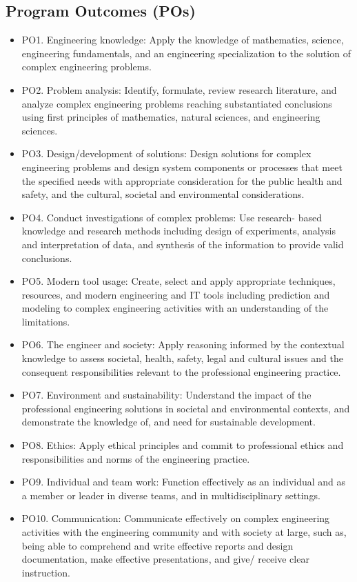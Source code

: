 \documentclass[12pt]{report}	%
\begin{document}
\subsection*{Program Outcomes (POs)}
\begin{itemize}
    \item PO1. Engineering knowledge:
    Apply the knowledge of mathematics, science, engineering fundamentals, and an engineering specialization to the solution of complex engineering problems.
    \item PO2. Problem analysis:
    Identify, formulate, review research literature, and analyze complex engineering problems reaching substantiated conclusions using first principles of mathematics, natural sciences, and engineering sciences.
    \item PO3. Design/development of solutions: Design solutions for complex engineering problems and design system components or processes that meet the specified needs with appropriate consideration for the public health and safety, and the cultural, societal and environmental considerations.
    \item PO4. Conduct investigations of complex problems: Use research- based knowledge and research methods including design of experiments, analysis and interpretation of data, and synthesis of the information to provide valid conclusions.
    \item PO5. Modern tool usage: Create, select and apply appropriate techniques, resources, and modern engineering and IT tools including prediction and modeling to complex engineering activities with an understanding of the limitations.
    \item PO6. The engineer and society: Apply reasoning informed by the contextual knowledge to assess societal, health, safety, legal and cultural issues and the consequent responsibilities relevant to the professional engineering practice.
    \item PO7. Environment and sustainability: Understand the impact of the professional engineering solutions in societal and environmental contexts, and demonstrate the knowledge of, and need for sustainable development.
    \item PO8. Ethics: Apply ethical principles and commit to professional ethics and responsibilities and norms of the engineering practice.
    \item PO9. Individual and team work: Function effectively as an individual and as a member or leader in diverse teams, and in multidisciplinary settings.
    \item PO10. Communication: Communicate effectively on complex engineering activities with the engineering community and with society at large, such as, being able to comprehend and write effective reports and design documentation, make effective presentations, and give/ receive clear instruction.

\end{itemize}
\end{document}
